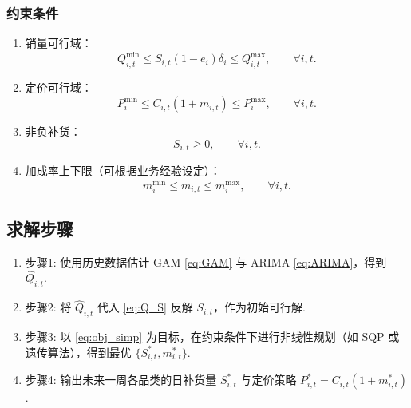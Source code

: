 \documentclass{cumcmthesis}
\begin{document}
\subsubsection{约束条件}
\begin{enumerate}
\item 销量可行域：
      \[
      Q_{i,t}^{\min} \le S_{i,t}(1-e_i)\delta_i \le Q_{i,t}^{\max},
      \qquad \forall i,t.
      \]
\item 定价可行域：
      \[
      P_{i}^{\min} \le C_{i,t}(1+m_{i,t}) \le P_{i}^{\max},
      \qquad \forall i,t.
      \]
\item 非负补货：
      \[
      S_{i,t} \ge 0,\qquad \forall i,t.
      \]
\item 加成率上下限（可根据业务经验设定）：
      \[
      m_{i}^{\min} \le m_{i,t} \le m_{i}^{\max},
      \qquad \forall i,t.
      \]
\end{enumerate}

\subsection{求解步骤}
\begin{enumerate}
\item 步骤1: 使用历史数据估计 GAM \eqref{eq:GAM} 与 ARIMA \eqref{eq:ARIMA}，得到 $\widehat{Q}_{i,t}$.
\item 步骤2: 将 $\widehat{Q}_{i,t}$ 代入 \eqref{eq:Q_S} 反解 $S_{i,t}$，作为初始可行解.
\item 步骤3: 以 \eqref{eq:obj_simp} 为目标，在约束条件下进行非线性规划（如 SQP 或遗传算法），得到最优 $\{S_{i,t}^*,m_{i,t}^*\}$.
\item 步骤4: 输出未来一周各品类的日补货量 $S_{i,t}^*$ 与定价策略 $P_{i,t}^*=C_{i,t}(1+m_{i,t}^*)$.
\end{enumerate}
\end{document}
